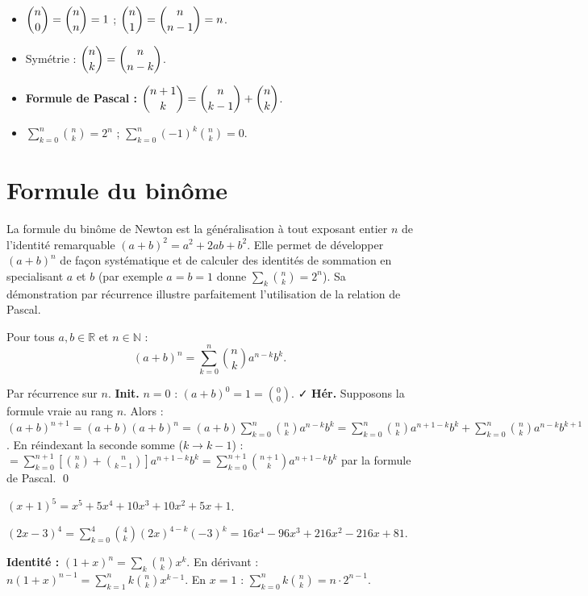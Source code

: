 \documentclass[11pt,a4paper,twoside]{book}
\newcommand{\N}{\mathbb{N}}
\newcommand{\R}{\mathbb{R}}
\begin{document}
\begin{theoremebox}
\begin{itemize}
  \item $\dbinom{n}{0}=\dbinom{n}{n}=1$ ; $\dbinom{n}{1}=\dbinom{n}{n-1}=n$.
  \item Symétrie : $\dbinom{n}{k}=\dbinom{n}{n-k}$.
  \item \textbf{Formule de Pascal :} $\dbinom{n+1}{k}=\dbinom{n}{k-1}+\dbinom{n}{k}$.
  \item $\displaystyle\sum_{k=0}^n\binom{n}{k}=2^n$ ; $\displaystyle\sum_{k=0}^n(-1)^k\binom{n}{k}=0$.
\end{itemize}
\end{theoremebox}

\section{Formule du binôme}

La formule du binôme de Newton est la généralisation à tout exposant entier $n$ de l'identité remarquable $(a+b)^2 = a^2 + 2ab + b^2$. Elle permet de développer $(a+b)^n$ de façon systématique et de calculer des identités de sommation en specialisant $a$ et $b$ (par exemple $a = b = 1$ donne $\sum_k \binom{n}{k} = 2^n$). Sa démonstration par récurrence illustre parfaitement l'utilisation de la relation de Pascal.

\begin{theoremebox}
Pour tous $a,b\in\R$ et $n\in\N$ :
\[
  (a+b)^n = \sum_{k=0}^n \binom{n}{k}a^{n-k}b^k.
\]
\end{theoremebox}

\begin{preuvebox}
Par récurrence sur $n$.
\textbf{Init.} $n=0$ : $(a+b)^0=1=\binom{0}{0}$. ✓
\textbf{Hér.} Supposons la formule vraie au rang $n$. Alors :
$(a+b)^{n+1}=(a+b)(a+b)^n=(a+b)\sum_{k=0}^n\binom{n}{k}a^{n-k}b^k
=\sum_{k=0}^n\binom{n}{k}a^{n+1-k}b^k+\sum_{k=0}^n\binom{n}{k}a^{n-k}b^{k+1}$.
En réindexant la seconde somme ($k\to k-1$) :
$=\sum_{k=0}^{n+1}\left[\binom{n}{k}+\binom{n}{k-1}\right]a^{n+1-k}b^k=\sum_{k=0}^{n+1}\binom{n+1}{k}a^{n+1-k}b^k$
par la formule de Pascal. \qed
\end{preuvebox}

\begin{exemplebox}[Applications]
$(x+1)^5 = x^5+5x^4+10x^3+10x^2+5x+1$.

$(2x-3)^4 = \sum_{k=0}^4\binom{4}{k}(2x)^{4-k}(-3)^k = 16x^4-96x^3+216x^2-216x+81$.

\textbf{Identité :} $(1+x)^n = \sum_k\binom{n}{k}x^k$.
En dérivant : $n(1+x)^{n-1}=\sum_{k=1}^n k\binom{n}{k}x^{k-1}$.
En $x=1$ : $\displaystyle\sum_{k=0}^n k\binom{n}{k}=n\cdot2^{n-1}$.
\end{exemplebox}
\end{document}

